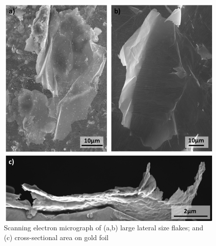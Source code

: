\begin{figure}[h]
	\begin{center}
		\includegraphics[scale=0.3]{Heterostructures/SEMImagesFlake.png}
		\caption{Scanning electron micrograph of (a,b) large lateral size flakes; and (c) cross-sectional area on gold foil}
		\label{fig:HeterostructuresSEMImagesFlake}
	\end{center}
\end{figure}

